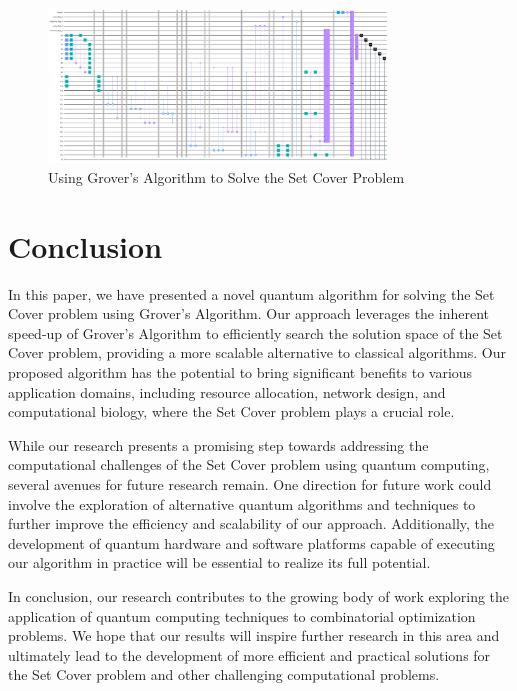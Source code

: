 \begin{figure}[htp]
    \centering
    \includegraphics[width=9cm]{Figures/Set_Cover_circuit.png}
    \caption{Using Grover's Algorithm to Solve the Set Cover Problem}
    \label{fig:Set_Cover}
\end{figure}

\section{Conclusion}
In this paper, we have presented a novel quantum algorithm for solving the Set Cover problem using Grover's Algorithm. Our approach leverages the inherent speed-up of Grover's Algorithm to efficiently search the solution space of the Set Cover problem, providing a more scalable alternative to classical algorithms. Our proposed algorithm has the potential to bring significant benefits to various application domains, including resource allocation, network design, and computational biology, where the Set Cover problem plays a crucial role.

While our research presents a promising step towards addressing the computational challenges of the Set Cover problem using quantum computing, several avenues for future research remain. One direction for future work could involve the exploration of alternative quantum algorithms and techniques to further improve the efficiency and scalability of our approach. Additionally, the development of quantum hardware and software platforms capable of executing our algorithm in practice will be essential to realize its full potential.

In conclusion, our research contributes to the growing body of work exploring the application of quantum computing techniques to combinatorial optimization problems. We hope that our results will inspire further research in this area and ultimately lead to the development of more efficient and practical solutions for the Set Cover problem and other challenging computational problems.

